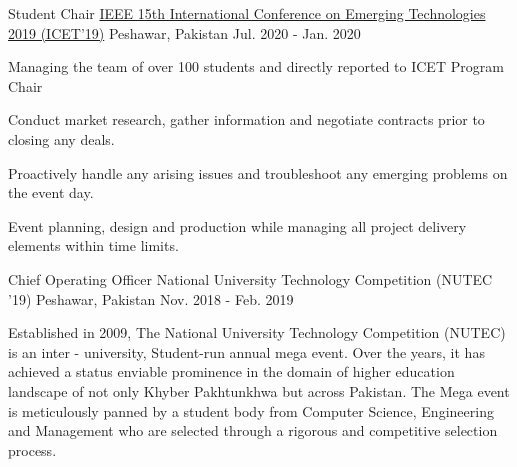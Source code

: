 \begin{cventries}
\cventry
{Student Chair} %
{\href{http://icet.org.pk/2019/}{IEEE 15th International Conference on Emerging Technologies 2019 (ICET'19)}} %
{Peshawar, Pakistan} %
{Jul. 2020 - Jan. 2020} %
{ %
\begin{cvitems}
\item {Managing the team of over 100 students and directly reported to ICET Program Chair}
\item{Conduct market research, gather information and negotiate contracts prior to closing any deals.}
\item{Proactively handle any arising issues and troubleshoot any emerging problems on the event day.}
\item {Event planning, design and production while managing all project delivery elements within time limits.}
\end{cvitems}
}


\cventry
{Chief Operating Officer} %
{National University Technology Competition (NUTEC '19)} %
{Peshawar, Pakistan} %
{Nov. 2018 - Feb. 2019} %
{ %
\begin{cvitems}
\begin{flushleft} \justifying
Established in 2009, The National University Technology Competition (NUTEC) is an inter - university, Student-run annual mega event. Over the years, it has achieved a status enviable prominence in the domain of higher education landscape of not only Khyber Pakhtunkhwa but across Pakistan. The Mega event is meticulously panned by a student body from Computer Science, Engineering and Management who are selected through a rigorous and competitive selection process.
\end{flushleft}
\end{cvitems}
}

\end{cventries}